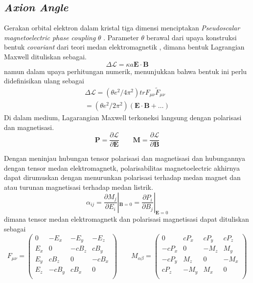 \subsection{\textit{Axion Angle}}
Gerakan orbital elektron dalam kristal tiga dimensi menciptakan \textit{Pseudoscalar magnetoelectric phase coupling} $\theta$ \parencite{PhysRevLett.102.146805}. Parameter $\theta$ berawal dari upaya konstruksi bentuk \textit{covariant} dari teori medan elektromagnetik \parencite{O'Dell01031963}, dimana bentuk Lagrangian Maxwell dituliskan sebagai.
\[
\Delta \mathcal{L}=\kappa a \mathbf{E \cdot B}
\]
namun dalam upaya perhitungan numerik, \parencite{O'Dell01031963} menunjukkan bahwa bentuk ini perlu didefinisikan ulang sebagai
\[
\begin{align}
\Delta \mathcal{L} = (\theta e^2 / 4 \pi^2)trF_{\mu \nu}\tilde{F}_{\mu \nu} \\
= (\theta e^2 / 2 \pi^2)(\mathbf{E \cdot B} + \dots)
\end{align}
\]
Di dalam medium, Lagarangian Maxwell terkoneksi langsung dengan polarisasi dan magnetisasi.
\[
  \mathbf{P} = \frac{\partial \mathcal{L}}{\partial \mathbf{E}} \qquad
  \mathbf{M} = \frac{\partial \mathcal{L}}{\partial \mathbf{B}}
\]
\par 
Dengan meninjau hubungan tensor polarisasi dan magnetisasi dan hubungannya dengan tensor medan elektromagnetk, polarisabilitas magnetoelectric akhirnya dapat dirumuskan dengan menurunkan polarisasi terhadap medan magnet dan atau turunan magnetisasi terhadap medan listrik\parencite{PhysRevLett.58.1799}.
\[
\alpha_{ij} = \frac{\partial M_{j}}{\partial E_{i}}|_{\mathbf{B}=0} = \frac{\partial P_{i}}{\partial B_{j}}|_{\mathbf{E}=0 }
\]
dimana tensor medan elektromagnetk dan polarisasi magnetisasi dapat dituliskan sebagai
\[
F_{\mu \nu} = \begin{pmatrix}
0 & -E_{x} & -E_{y} & -E_{z} \\ 
E_{x} & 0 & -cB_{z} & cB_{y} \\
E_{y} & cB_{z} & 0 & -cB_{x} \\
E_{z} & -cB_{y} & cB_{x} & 0 \\
\end{pmatrix} \qquad
M_{\alpha \beta} = 
\begin{pmatrix}
0 & cP_{x} & cP_{y} & cP_{z} \\ 
-cP_{x} & 0 & -M_{z} & M_{y} \\
-cP_{y} & M_{z} & 0 & -M_{x} \\
cP_{z} & -M_{y} & M_{x} & 0 \\
\end{pmatrix}
\]
